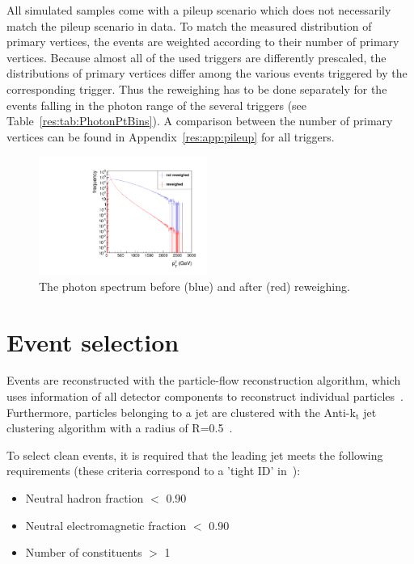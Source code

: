 All simulated samples come with a pileup scenario which does not necessarily match the pileup scenario in data. 
To match the measured distribution of primary vertices, the events are weighted according to their number of primary vertices. 
Because almost all of the used triggers are differently prescaled, the distributions of primary vertices differ among the various events triggered by the corresponding trigger.
Thus the reweighing has to be done separately for the events falling in the photon \pt range of the several triggers (see Table~\ref{res:tab:PhotonPtBins}).
A comparison between the number of primary vertices can be found in Appendix~\ref{res:app:pileup} for all triggers.
\begin{figure}[h]
  \centering
      \includegraphics[width=0.49\textwidth]{figures/resolution/eventSelection/PhotonPtComparison_reweighted.pdf} 
  \caption{The photon \pt spectrum before (blue) and after (red) reweighing.}  
  \label{res:fig:PhotonPtSpectrum}
\end{figure}


\section{Event selection}
\label{res:sec:EventSelection}
Events are reconstructed with the particle-flow reconstruction algorithm, which uses information of all detector components to reconstruct individual particles~\cite{CMS-PAS-PFT-09-001}.
Furthermore, particles belonging to a jet are clustered with the Anti-k$_{\text{t}}$ jet clustering algorithm with a radius of R=0.5~\cite{Cacciari:2008gp}.

To select clean \GAMJET events, it is required that the leading jet meets the following requirements (these criteria correspond to a 'tight ID' in~\cite{website:JetIdentification,bib:CMS-AN-2010-003}):
\begin{itemize}

 \item Neutral hadron fraction $<$ 0.90
 \item Neutral electromagnetic fraction $<$ 0.90
 \item Number of constituents $>$ 1
\end{itemize}

